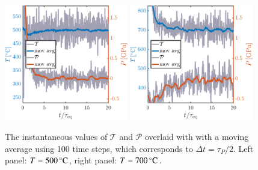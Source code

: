 \begin{figure}[!ht]
\begin{center}
  \includegraphics[width=0.48\textwidth]{../figures/TP-eq-500} 
    \includegraphics[width=0.48\textwidth]{../figures/TP-eq-700} 
  \caption{The instantaneous values of $\mathcal{T}$ and $\mathcal{P}$ overlaid with with a moving average using 100 time steps, which corresponds to $\Delta t = \tau_P/2$. Left panel: $T=\unit[500]{^\circ C}$,  right panel: $T=\unit[700]{^\circ C}$.}
  \label{fig:eq}
\end{center}
\end{figure}

